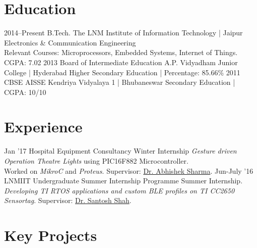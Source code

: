 \documentclass[]{friggeri-cv}
\begin{document}
\section{Education}

\begin{entrylist}
   \entry
    {2014–Present}
    {B.Tech.}
    {The LNM Institute of Information Technology | Jaipur}
    {Electronics \& Communication Engineering\\Relevant Courses: Microprocessors, Embedded Systems, Internet of Things.\\CGPA: 7.02}
  \entry
    {2013}
    {Board of Intermediate Education A.P.}
    {Vidyadham Junior College | Hyderabad}
    {Higher Secondary Education | Percentage: 85.66\%}
  \entry
    {2011}
    {CBSE AISSE}
    {Kendriya Vidyalaya 1 | Bhubaneswar}
    {Secondary Education | CGPA: 10/10}
\end{entrylist}

\section{Experience}

\begin{entrylist}
  \entry
    {Jan '17}
    {Hospital Equipment Consultancy}
    {Winter Internship}
    {\emph{Gesture driven Operation Theatre Lights} using PIC16F882 Microcontroller.\\Worked on \textit{MikroC} and \textit{Proteus}. Supervisor: \href{http://lnmiit.ac.in/Department/ECE/ece_FacultyProfile.aspx?nDeptID=119}{Dr. Abhishek Sharma}.}
  \entry
    {Jun-July ’16}
    {LNMIIT Undergraduate Summer Internship Programme}
    {Summer Internship.}
    {\emph{Developing TI RTOS applications and custom BLE profiles on TI CC2650 Sensortag}. Supervisor: \href{http://www.lnmiit.ac.in/Department/ECE/ece_FacultyProfile.aspx?nDeptID=189}{Dr. Santosh Shah}.}
\end{entrylist}

\section{Key Projects}
\end{document}
